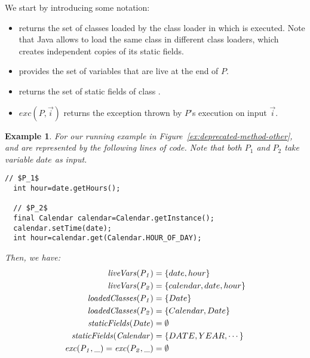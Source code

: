\documentclass[conference]{IEEEtran}
\newtheorem{example}{Example}
\begin{document}
We start by introducing some notation:
\begin{itemize}
\item {} returns the set of classes loaded by the class loader
  in which  is executed. Note that Java allows to load the same class
in different class loaders, which creates independent copies of its
static fields.
\item {} provides the set of variables that are live
at the end of $P$. %
\item {} returns
  the set of static fields of class .
\item $exc(P, \vec{i})$ returns the exception thrown by $P$'s execution on input $\vec{i}$.  
\end{itemize}  

\begin{example}\label{ex:defs}
%
  For our running example in Figure~\ref{ex:deprecated-method-other},
   and  are represented by the following lines of code. Note that
  both $P_1$ and $P_2$ take variable $date$ as input.

\begin{lstlisting}[mathescape=true,showstringspaces=false]
  // $P_1$
  int hour=date.getHours();

  // $P_2$
  final Calendar calendar=Calendar.getInstance();
  calendar.setTime(date);
  int hour=calendar.get(Calendar.HOUR_OF_DAY);
\end{lstlisting}
%
Then, we have:
\[
\begin{aligned}[t]
  \mathit{{liveVars(P_1)}} &= \{date, hour\}\\
  \mathit{{liveVars(P_2)}} &= \{calendar, date, hour\}\\  
  \mathit{{loadedClasses(P_1)}} &= \{Date\} \\
  \mathit{{loadedClasses(P_2)}} &= \{Calendar, Date\} \\  
  \mathit{{staticFields(Date)}} &= \emptyset\\
  \mathit{{staticFields(Calendar)}} &= \{DATE, YEAR, \cdots\}\\
  \mathit{{exc(P_1, \_)}}=\mathit{{exc(P_2, \_)}} &=\emptyset
\end{aligned}
\]
\end{example}

\end{document}
